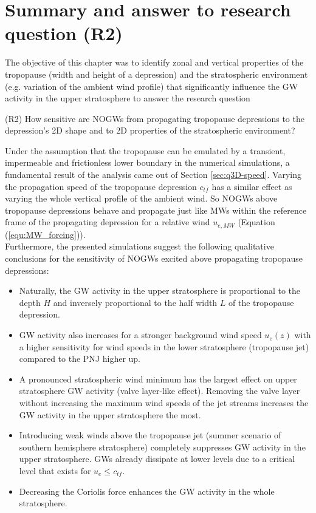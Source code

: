 \section{Summary and answer to research question (R2)}
\label{sec:q3D-summary}
The objective of this chapter was to identify zonal and vertical properties of the tropopause (width and height of a depression) and the stratospheric environment (e.g. variation of the ambient wind profile) that significantly influence the GW activity in the upper stratosphere to answer the research question
\begin{tcolorbox}[]
    (R2) How sensitive are NOGWs from propagating tropopause depressions to the depression's 2D shape and to 2D properties of the stratospheric environment?
\end{tcolorbox}
Under the assumption that the tropopause can be emulated by a transient, impermeable and frictionless lower boundary in the numerical simulations, a fundamental result of the analysis came out of Section \ref{sec:q3D-speed}. Varying the propagation speed of the tropopause depression $c_{tf}$ has a similar effect as varying the whole vertical profile of the ambient wind. So NOGWs above tropopause depressions behave and propagate just like MWs within the reference frame of the propagating depression for a relative wind $u_{e,MW}$ (Equation (\ref{equ:MW_forcing})). \\
Furthermore, the presented simulations suggest the following qualitative conclusions for the sensitivity of NOGWs excited above propagating tropopause depressions:
\begin{itemize}
    \item Naturally, the GW activity in the upper stratosphere is proportional to the depth $H$ and inversely proportional to the half width $L$ of the tropopause depression.
    \item GW activity also increases for a stronger background wind speed $u_e(z)$ with a higher sensitivity for wind speeds in the lower stratosphere (tropopause jet) compared to the PNJ higher up.
    \item A pronounced stratospheric wind minimum has the largest effect on upper stratosphere GW activity (valve layer-like effect). Removing the valve layer without increasing the maximum wind speeds of the jet streams increases the GW activity in the upper stratosphere the most. 
    \item Introducing weak winds above the tropopause jet (summer scenario of southern hemisphere stratosphere) completely suppresses GW activity in the upper stratosphere. GWs already dissipate at lower levels due to a critical level that exists for $u_e \leq c_{tf}$.
    \item Decreasing the Coriolis force enhances the GW activity in the whole stratosphere.
\end{itemize}
